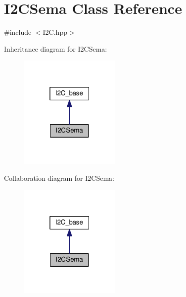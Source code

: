 \hypertarget{class_i2_c_sema}{}\section{I2\+C\+Sema Class Reference}
\label{class_i2_c_sema}


{\ttfamily \#include $<$I2\+C.\+hpp$>$}



Inheritance diagram for I2\+C\+Sema\+:\nopagebreak
\begin{figure}[H]
\begin{center}
\leavevmode
\includegraphics[width=139pt]{class_i2_c_sema__inherit__graph}
\end{center}
\end{figure}


Collaboration diagram for I2\+C\+Sema\+:\nopagebreak
\begin{figure}[H]
\begin{center}
\leavevmode
\includegraphics[width=139pt]{class_i2_c_sema__coll__graph}
\end{center}
\end{figure}
